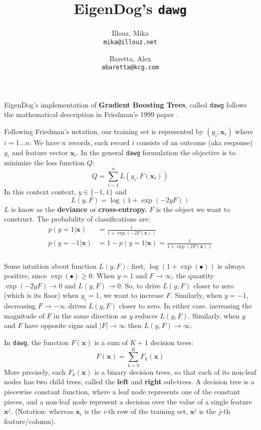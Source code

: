 \documentclass{article}
\author{
  Illouz, Mika \\      \texttt{mika@illouz.net}
  \and
  Baretta, Alex \\     \texttt{abaretta@kcg.com}
}
\title{EigenDog's \texttt{dawg}}
\newcommand{\vx}[0]{\mathbf{x}}
\begin{document}
\maketitle

EigenDog's implementation of {\bf Gradient Boosting Trees}, called
\texttt{dawg} follows the mathematical description in Friedman's 1999
paper \cite{GBM}.

Following Friedman's notation, our training set is represented by
$(y_i, \vx_i)$ where $i = 1 \ldots n$: We have $n$ records, each
record $i$ consists of an outcome (aka response) $y_i$ and feature
vector $\vx_i$.  In the general \texttt{dawg} formulation the objective is to
minimize the loss function $Q$:
%
\begin{equation}
\label{objective}
Q = \sum_{i=1}^{n} L(y_i, F(\vx_i))
\end{equation}
%
In this context context, $y \in \{ -1, 1 \}$ and
%
\[
L(y,F) = \log ( 1 + \exp( -2 y F ) )
\]
$L$ is know as the {\bf deviance} or {\bf cross-entropy.}  $F$ is the
object we want to construct.  The probability of classifications are:
\begin{equation}
\begin{split}
p(y =1|\vx) &= \frac{1}{1 + \exp(-2 F(\vx) )} \\
p(y =-1|\vx) &= 1 - p(y=1|\vx) = \frac{1}{1 + \exp(2 F(\vx) )} \\
\end{split}
\end{equation}

Some intuition about function $L(y,F)$:
first, $\log( 1 + \exp (\bullet) )$ is always positive, since
$\exp(\bullet) \ge 0$.  When $y=1$ and $F \rightarrow \infty$, the
quantity $\exp ( -2 y F ) \rightarrow 0$ and $L(y, F) \rightarrow 0$.
So, to drive $L(y, F)$ closer to zero (which is its floor) when
$y_i=1$, we want to increase $F$.  Similarly, when $y=-1$, decreasing
$F \rightarrow -\infty$ drives $L(y, F)$ closer to zero.  In either
case, increasing the magnitude of $F$ in the same direction as $y$
reduces $L(y,F)$.  Similarly, when $y$ and $F$ have opposite signs and
$| F | \rightarrow \infty$ then $L(y,F) \rightarrow \infty$.

In \texttt{dawg}, the function $F(\vx)$ is a sum of $K+1$ decision trees:
\[
F(\vx) = \sum_{k=0}^K F_k(\vx)
\]
More precisely, each $F_k(\vx)$ is a binary decision trees, so that
each of its non-leaf nodes has two child trees, called the {\bf left}
and {\bf right} sub-trees.  A decision tree is a piecewise constant
function, where a leaf node represents one of the constant pieces, and
a non-leaf node represent a decision over the value of a single
feature $\vx^j$.  (Notation: whereas $\vx_i$ is the $i$-th row of the
training set, $\vx^j$ is the $j$-th feature/column).
\end{document}
